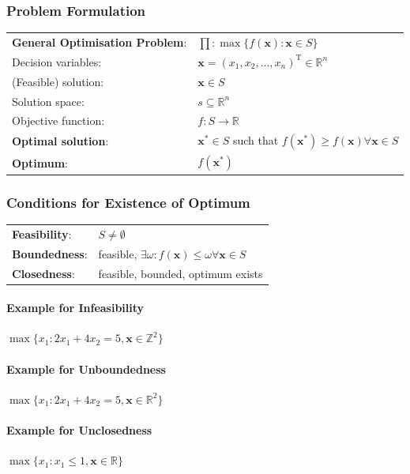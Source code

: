 \documentclass[11pt]{article}
\begin{document}
\subsubsection{Problem Formulation}
\begin{minipage}{\textwidth}
	\renewcommand{\arraystretch}{1.5}
	\begin{tabularx}{\linewidth}{l X}
		\textbf{General Optimisation Problem}: & $\prod: \max\{f(\textbf{x}):\textbf{x}\in S\}$\\
		Decision variables: & $\textbf{x} = (x_1,x_2,...,x_n)^{\text{T}}\in\mathbb{R}^n$\\
		(Feasible) solution: & $\textbf{x} \in S$\\
		Solution space: & $s\subseteq\mathbb{R}^n$\\
		Objective function: & $f: S\rightarrow\mathbb{R}$\\
		\textbf{Optimal solution}: & $\textbf{x}^* \in S$ such that $f(\textbf{x}^*)\geq f(\textbf{x}) \forall \textbf{x} \in S$\\
		\textbf{Optimum}: & $f(\textbf{x}^*)$
	\end{tabularx}
\end{minipage}

\subsubsection{Conditions for Existence of Optimum}
\begin{minipage}{\textwidth}
	\renewcommand{\arraystretch}{1.5}
	\begin{tabularx}{\linewidth}{l X}
		\textbf{Feasibility}: & $S\neq\emptyset$\\
		\textbf{Boundedness}: & feasible, $\exists\omega:f(\textbf{x})\leq\omega\forall \textbf{x}\in S$\\
		\textbf{Closedness}: & feasible, bounded, optimum exists
	\end{tabularx}
\end{minipage}
\paragraph{Example for Infeasibility} $\max\{x_1: 2x_1 + 4x_2 = 5, \textbf{x}\in\mathbb{Z}^2\}$
\paragraph{Example for Unboundedness} $\max\{x_1: 2x_1 + 4x_2 = 5, \textbf{x}\in\mathbb{R}^2\}$
\paragraph{Example for Unclosedness} $\max\{x_1: x_1 \leq 1, \textbf{x}\in\mathbb{R}\}$
\end{document}
